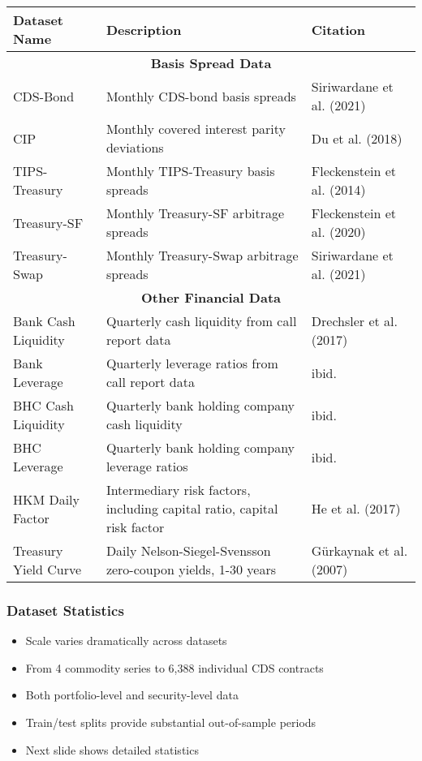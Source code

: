 \documentclass[ignorenonframetext, 9pt]{beamer}
\begin{document}
\begin{frame}[plain]
  \tiny
  \begin{table}
  \centering
  \begin{tabular}{p{2.5cm}p{5cm}p{2.5cm}}
  \toprule
  Dataset Name & Description & Citation \\
  \midrule
  \multicolumn{3}{c}{\textbf{Basis Spread Data}} \\
  \midrule
  CDS-Bond & Monthly CDS-bond basis spreads & Siriwardane et al. (2021) \\
  CIP & Monthly covered interest parity deviations & Du et al. (2018) \\
  TIPS-Treasury & Monthly TIPS-Treasury basis spreads & Fleckenstein et al. (2014) \\
  Treasury-SF & Monthly Treasury-SF arbitrage spreads & Fleckenstein et al. (2020) \\
  Treasury-Swap & Monthly Treasury-Swap arbitrage spreads & Siriwardane et al. (2021) \\
  \midrule
  \multicolumn{3}{c}{\textbf{Other Financial Data}} \\
  \midrule
  Bank Cash Liquidity & Quarterly cash liquidity from call report data & Drechsler et al. (2017) \\
  Bank Leverage & Quarterly leverage ratios from call report data & ibid. \\
  BHC Cash Liquidity & Quarterly bank holding company cash liquidity & ibid. \\
  BHC Leverage & Quarterly bank holding company leverage ratios & ibid. \\
  HKM Daily Factor & Intermediary risk factors, including capital ratio, capital risk factor & He et al. (2017) \\
  Treasury Yield Curve & Daily Nelson-Siegel-Svensson zero-coupon yields, 1-30 years & Gürkaynak et al. (2007) \\
  \bottomrule
  \end{tabular}
  \end{table}
\end{frame}

\begin{frame}
  \frametitle{Dataset Statistics}
  \begin{itemize}
  \item Scale varies dramatically across datasets
  \item From 4 commodity series to 6,388 individual CDS contracts
  \item Both portfolio-level and security-level data
  \item Train/test splits provide substantial out-of-sample periods
  \item Next slide shows detailed statistics
  \end{itemize}
\end{frame}
\end{document}
